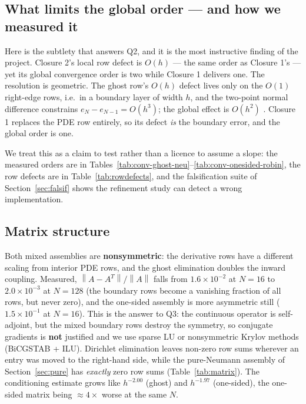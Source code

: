 \documentclass[11pt,a4paper]{article}
\newcommand{\norm}[1]{\left\lVert #1 \right\rVert}
\begin{document}
\subsection{What limits the global order --- and how we measured it}
\label{sec:order-argument}

Here is the subtlety that answers Q2, and it is the most instructive finding
of the project. Closure 2's local row defect is $O(h)$ --- the same order as
Closure 1's --- yet its global convergence order is two while Closure 1
delivers one. The resolution is geometric. The ghost row's $O(h)$ defect
lives only on the $O(1)$ right-edge rows, i.e.\ in a boundary layer of width
$h$, and the two-point normal difference constrains
$e_N - e_{N-1} = O(h^3)$; the global effect is $O(h^2)$ \cite{leveque2007}.
Closure 1 replaces the PDE row entirely, so its defect \emph{is} the boundary
error, and the global order is one.

We treat this as a claim to test rather than a licence to assume a slope:
the measured orders are in
Tables~\ref{tab:conv-ghost-neu}--\ref{tab:conv-onesided-robin}, the row
defects are in Table~\ref{tab:rowdefects}, and the falsification suite of
Section~\ref{sec:falsif} shows the refinement study can detect a wrong
implementation.

\subsection{Matrix structure}
\label{sec:matrix}

Both mixed assemblies are \textbf{nonsymmetric}: the derivative rows have a
different scaling from interior PDE rows, and the ghost elimination doubles
the inward coupling. Measured, $\norm{A-A^T}/\norm{A}$ falls from
$1.6\times10^{-2}$ at $N=16$ to $2.0\times10^{-3}$ at $N=128$ (the boundary
rows become a vanishing fraction of all rows, but never zero), and the
one-sided assembly is more asymmetric still ($1.5\times10^{-1}$ at $N=16$).
This is the answer to Q3: the continuous operator is self-adjoint, but the
mixed boundary rows destroy the symmetry, so conjugate gradients is
\textbf{not} justified and we use sparse LU or nonsymmetric Krylov methods
(BiCGSTAB + ILU). Dirichlet elimination leaves non-zero row sums wherever an
entry was moved to the right-hand side, while the pure-Neumann assembly of
Section~\ref{sec:pure} has \emph{exactly} zero row sums
(Table~\ref{tab:matrix}). The conditioning estimate grows like $h^{-2.00}$
(ghost) and $h^{-1.97}$ (one-sided), the one-sided matrix being $\approx
4\times$ worse at the same $N$.
\end{document}
